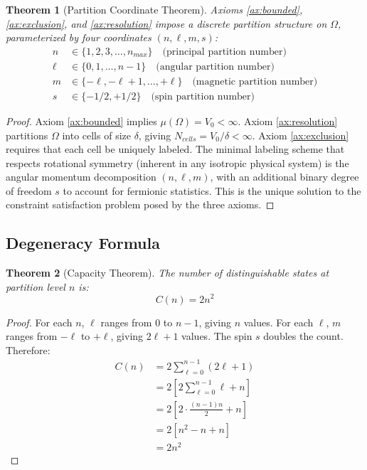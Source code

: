 \documentclass[12pt,a4paper]{article}
\newtheorem{theorem}{Theorem}[section]
\begin{document}
\begin{theorem}[Partition Coordinate Theorem]
\label{thm:partition}
Axioms \ref{ax:bounded}, \ref{ax:exclusion}, and \ref{ax:resolution} impose a discrete partition structure on $\Omega$, parameterized by four coordinates $(n,\ell,m,s)$:
\begin{align}
n &\in \{1,2,3,\ldots,n_{max}\} \quad \text{(principal partition number)} \\
\ell &\in \{0,1,\ldots,n-1\} \quad \text{(angular partition number)} \\
m &\in \{-\ell,-\ell+1,\ldots,+\ell\} \quad \text{(magnetic partition number)} \\
s &\in \{-1/2,+1/2\} \quad \text{(spin partition number)}
\end{align}
\end{theorem}

\begin{proof}
Axiom \ref{ax:bounded} implies $\mu(\Omega) = V_0 < \infty$. Axiom \ref{ax:resolution} partitions $\Omega$ into cells of size $\delta$, giving $N_{cells} = V_0/\delta < \infty$. Axiom \ref{ax:exclusion} requires that each cell be uniquely labeled. The minimal labeling scheme that respects rotational symmetry (inherent in any isotropic physical system) is the angular momentum decomposition $(n,\ell,m)$, with an additional binary degree of freedom $s$ to account for fermionic statistics. This is the unique solution to the constraint satisfaction problem posed by the three axioms.
\end{proof}

\subsection{Degeneracy Formula}

\begin{theorem}[Capacity Theorem]
\label{thm:capacity}
The number of distinguishable states at partition level $n$ is:
\begin{equation}
C(n) = 2n^2
\end{equation}
\end{theorem}

\begin{proof}
For each $n$, $\ell$ ranges from $0$ to $n-1$, giving $n$ values. For each $\ell$, $m$ ranges from $-\ell$ to $+\ell$, giving $2\ell+1$ values. The spin $s$ doubles the count. Therefore:
\begin{align}
C(n) &= 2 \sum_{\ell=0}^{n-1} (2\ell+1) \\
&= 2 \left[ 2\sum_{\ell=0}^{n-1} \ell + n \right] \\
&= 2 \left[ 2 \cdot \frac{(n-1)n}{2} + n \right] \\
&= 2 \left[ n^2 - n + n \right] \\
&= 2n^2
\end{align}
\end{proof}
\end{document}
